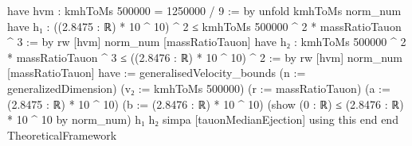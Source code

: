 \documentclass[11pt,a4paper]{article}
\begin{document}
{  have hvm : kmhToMs 500000 = 1250000 / 9 := by
    unfold kmhToMs
    norm\_\allowbreak{}num
  have h₁ : ((2.8475 : ℝ) * 10 \textasciicircum{} 10) \textasciicircum{} 2 ≤
      kmhToMs 500000 \textasciicircum{} 2 * massRatioTauon \textasciicircum{} 3 := by
    rw [hvm]
    norm\_\allowbreak{}num [massRatioTauon]
  have h₂ : kmhToMs 500000 \textasciicircum{} 2 * massRatioTauon \textasciicircum{} 3 ≤
      ((2.8476 : ℝ) * 10 \textasciicircum{} 10) \textasciicircum{} 2 := by
    rw [hvm]
    norm\_\allowbreak{}num [massRatioTauon]
  have := generalisedVelocity\_\allowbreak{}bounds (n := generalizedDimension)
    (v₂ := kmhToMs 500000) (r := massRatioTauon)
    (a := (2.8475 : ℝ) * 10 \textasciicircum{} 10) (b := (2.8476 : ℝ) * 10 \textasciicircum{} 10)
    (show (0 : ℝ) ≤ (2.8476 : ℝ) * 10 \textasciicircum{} 10 by norm\_\allowbreak{}num) h₁ h₂
  simpa [tauonMedianEjection] using this
\mbox{}
end
\mbox{}
end TheoreticalFramework
\mbox{}
}

\clearpage
\end{document}
